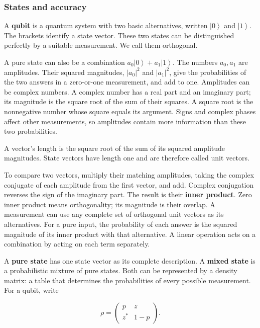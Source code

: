 \documentclass[11pt,letterpaper]{article}
\begin{document}
\subsubsection{States and accuracy}\label{states-and-accuracy}

A \textbf{qubit} is a quantum system with two basic alternatives, written \(\left| 0 \right\rangle\) and \(\left| 1 \right\rangle\). The brackets identify a state vector. These two states can be distinguished perfectly by a suitable measurement. We call them orthogonal.

A pure state can also be a combination \(a_{0}\left| 0 \right\rangle + a_{1}\left| 1 \right\rangle\). The numbers \(a_{0},a_{1}\) are amplitudes. Their squared magnitudes, \(\left| a_{0} \right|^{2}\) and \(\left| a_{1} \right|^{2}\), give the probabilities of the two answers in a zero-or-one measurement, and add to one. Amplitudes can be complex numbers. A complex number has a real part and an imaginary part; its magnitude is the square root of the sum of their squares. A square root is the nonnegative number whose square equals its argument. Signs and complex phases affect other measurements, so amplitudes contain more information than these two probabilities.

A vector's length is the square root of the sum of its squared amplitude magnitudes. State vectors have length one and are therefore called unit vectors.

To compare two vectors, multiply their matching amplitudes, taking the complex conjugate of each amplitude from the first vector, and add. Complex conjugation reverses the sign of the imaginary part. The result is their \textbf{inner product}. Zero inner product means orthogonality; its magnitude is their overlap. A measurement can use any complete set of orthogonal unit vectors as its alternatives. For a pure input, the probability of each answer is the squared magnitude of its inner product with that alternative. A linear operation acts on a combination by acting on each term separately.

A \textbf{pure state} has one state vector as its complete description. A \textbf{mixed state} is a probabilistic mixture of pure states. Both can be represented by a density matrix: a table that determines the probabilities of every possible measurement. For a qubit, write

\[\rho = \begin{pmatrix}
p & z \\
z^{*} & 1 - p
\end{pmatrix}.\]
\end{document}
